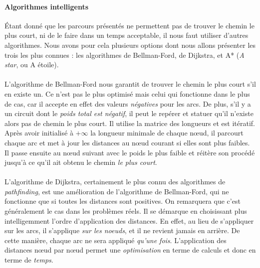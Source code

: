 \paragraph{Algorithmes intelligents} Étant donné que les parcours présentés ne permettent pas de trouver le chemin
le plus court, ni de le faire dans un temps acceptable, il nous faut utiliser d'autres algorithmes. Nous avons pour
cela plusieurs options dont nous allons présenter les trois les plus connues : les algorithmes de Bellman-Ford, de Dijkstra,
et A* (\emph{A star}, ou A étoile).

\paragraph{} L'algorithme de Bellman-Ford nous garantit de trouver le chemin le plus court s'il en existe un. Ce n'est pas
le plus optimisé mais celui qui fonctionne dans le plus de cas, car il accepte en effet des valeurs \emph{négatives} pour les
arcs. De plus, s'il y a un circuit dont le \emph{poids total est négatif}, il peut le repérer et statuer qu'il n'existe alors
pas de chemin le plus court. Il utilise la matrice des longueurs et est itératif. Après avoir initialisé à $+\infty$ la 
longueur minimale de chaque n\oe{}ud, il parcourt chaque arc et met à jour les distances au n\oe{}ud courant si elles sont
plus faibles. Il passe ensuite au n\oe{}ud suivant avec le poids le plus faible et réitère son procédé jusqu'à ce qu'il ait
obtenu le chemin \emph{le plus court}.

\paragraph{} L'algorithme de Dijkstra, certainement le plus connu des algorithmes de \emph{pathfinding}, est une amélioration
de l'algorithme de Bellman-Ford, qui ne fonctionne que si toutes les distances sont positives. On remarquera que c'est généralement
le cas dans les problèmes réels. Il se démarque en choisissant plus intelligemment l'ordre d'application des distances. En effet,
au lieu de s'appliquer sur les arcs, il s'applique \emph{sur les noeuds}, et il ne revient jamais en arrière. De cette manière,
chaque arc ne sera appliqué \emph{qu'une fois}. L'application des distances n\oe{}ud par n\oe{}ud permet une \emph{
optimisation} en terme de calculs et donc en terme de \emph{temps}.

